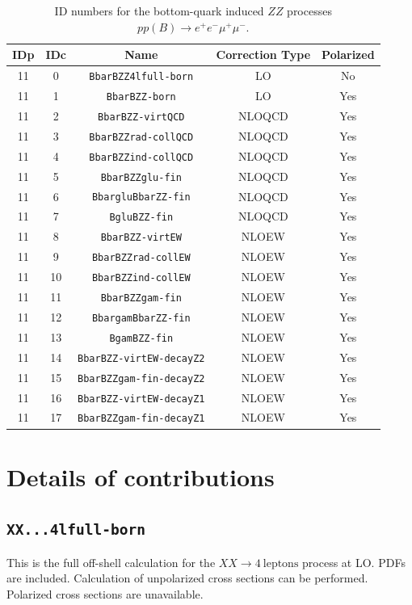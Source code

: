\documentclass[english,12pt]{article}
\begin{document}
\begin{table}[th!]
\begin{center}
\begin{tabular}{|c|c|c|c|c|}\hline
IDp & IDc & Name & Correction Type & Polarized \\
\hline
11 & 0 & {\tt BbarBZZ4lfull-born} & LO & No\\
11 & 1 & {\tt BbarBZZ-born} & LO & Yes\\
11 & 2 & {\tt BbarBZZ-virtQCD} & NLOQCD & Yes\\
11 & 3 & {\tt BbarBZZrad-collQCD} & NLOQCD & Yes\\
11 & 4 & {\tt BbarBZZind-collQCD} & NLOQCD & Yes\\
11 & 5 & {\tt BbarBZZglu-fin} & NLOQCD & Yes\\
11 & 6 & {\tt BbargluBbarZZ-fin} & NLOQCD & Yes\\
11 & 7 & {\tt BgluBZZ-fin} & NLOQCD & Yes\\
11 & 8 & {\tt BbarBZZ-virtEW} & NLOEW & Yes\\
11 & 9 & {\tt BbarBZZrad-collEW} & NLOEW & Yes\\
11 & 10 & {\tt BbarBZZind-collEW} & NLOEW & Yes\\
11 & 11 & {\tt BbarBZZgam-fin} & NLOEW & Yes\\
11 & 12 & {\tt BbargamBbarZZ-fin} & NLOEW & Yes\\
11 & 13 & {\tt BgamBZZ-fin} & NLOEW & Yes\\
11 & 14 & {\tt BbarBZZ-virtEW-decayZ2} & NLOEW & Yes\\
11 & 15 & {\tt BbarBZZgam-fin-decayZ2} & NLOEW & Yes\\
11 & 16 & {\tt BbarBZZ-virtEW-decayZ1} & NLOEW & Yes\\
11 & 17 & {\tt BbarBZZgam-fin-decayZ1} & NLOEW & Yes\\
\hline
\end{tabular}
\caption{\small ID numbers for the bottom-quark induced $ZZ$ processes $pp(B) \to e^+e^-\mu^+\mu^-$.}
\label{tab:IDs_proc_cont_ZZ_B}
\end{center}
\end{table}

\newpage
\section{Details of contributions}
\label{sec:cont_details}
\subsection{\tt XX...4lfull-born}
\label{sec:full-born}
This is the full off-shell calculation for the $XX \to 4\ \text{leptons}$ process at LO. 
PDFs are included. Calculation of unpolarized cross sections can be performed. 
Polarized cross sections are unavailable.   
\end{document}
